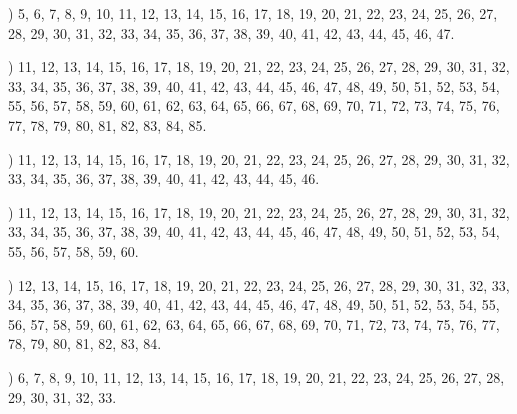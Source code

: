 \documentclass[a4paper,11pt]{article}
\begin{document}
\vspace{\spaceFour}



\noindent
{}) 5, 6, 7, 8, 9, 10, 11, 12, 13, 14, 15, 16, 17, 18,
19, 20, 21, 22, 23, 24, 25, 26, 27, 28, 29, 30, 31, 32, 33, 34, 35,
36, 37, 38, 39, 40, 41, 42, 43, 44, 45, 46, 47.

\vspace{\spaceFour}



\noindent
{}) 11, 12, 13, 14, 15, 16, 17, 18, 19, 20, 21, 22, 23,
24, 25, 26, 27, 28, 29, 30, 31, 32, 33, 34, 35, 36, 37, 38, 39, 40,
41, 42, 43, 44, 45, 46, 47, 48, 49, 50, 51, 52, 53, 54, 55, 56, 57,
58, 59, 60, 61, 62, 63, 64, 65, 66, 67, 68, 69, 70, 71, 72, 73, 74,
75, 76, 77, 78, 79, 80, 81, 82, 83, 84, 85.

\vspace{\spaceFour}



\noindent
{}) 11, 12, 13, 14, 15, 16, 17, 18, 19, 20, 21, 22, 23,
24, 25, 26, 27, 28, 29, 30, 31, 32, 33, 34, 35, 36, 37, 38, 39, 40,
41, 42, 43, 44, 45, 46.

\vspace{\spaceFour}



\noindent
{}) 11, 12, 13, 14, 15, 16, 17, 18, 19, 20, 21, 22, 23,
24, 25, 26, 27, 28, 29, 30, 31, 32, 33, 34, 35, 36, 37, 38, 39, 40,
41, 42, 43, 44, 45, 46, 47, 48, 49, 50, 51, 52, 53, 54, 55, 56, 57,
58, 59, 60.

\vspace{\spaceFour}



\noindent
{}) 12, 13, 14, 15, 16, 17, 18, 19, 20, 21, 22, 23, 24,
25, 26, 27, 28, 29, 30, 31, 32, 33, 34, 35, 36, 37, 38, 39, 40, 41,
42, 43, 44, 45, 46, 47, 48, 49, 50, 51, 52, 53, 54, 55, 56, 57, 58,
59, 60, 61, 62, 63, 64, 65, 66, 67, 68, 69, 70, 71, 72, 73, 74, 75,
76, 77, 78, 79, 80, 81, 82, 83, 84.

\vspace{\spaceFour}



\noindent
{}) 6, 7, 8, 9, 10, 11, 12, 13, 14, 15, 16, 17, 18, 19,
20, 21, 22, 23, 24, 25, 26, 27, 28, 29, 30, 31, 32, 33.

\vspace{\spaceFour}
\end{document}
